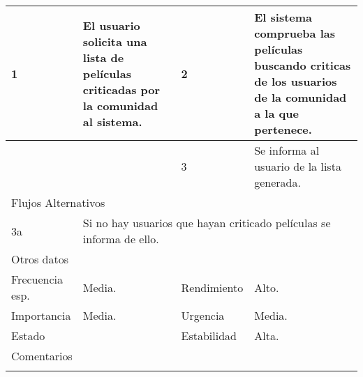 \documentclass{article}
\begin{document}
\begin{table}[h]
\begin{tabular}{|l|l|l|l|l|l|}
\hline
\multicolumn{1}{|p{1cm}|}{1} & \multicolumn{2}{p{3cm}}{El usuario solicita una lista de películas criticadas por la comunidad al sistema.} & \multicolumn{1}{|p{1cm}|}{2} & \multicolumn{2}{p{3cm}|}{El sistema comprueba las películas buscando criticas de los usuarios de la comunidad a la que pertenece.}\\
\hline
\multicolumn{1}{|p{1cm}|}{} & \multicolumn{2}{p{3cm}}{} & \multicolumn{1}{|p{1cm}|}{3} & \multicolumn{2}{p{3cm}|}{Se informa al usuario de la lista generada.}\\
\hline
\multicolumn{6}{|p{10cm}|}{Flujos Alternativos}\\
\hline
\multicolumn{1}{|p{1cm}}{3a} & \multicolumn{5}{|p{9cm}|}{Si no hay usuarios que hayan criticado películas se informa de ello.}\\
\hline
\multicolumn{6}{|p{10cm}|}{Otros datos}\\
\hline
\multicolumn{1}{|p{2cm}|}{Frecuencia esp.} & \multicolumn{2}{p{3cm}}{Media.} & \multicolumn{1}{|p{2cm}|}{Rendimiento} & \multicolumn{2}{p{3cm}|}{Alto.}\\
\hline
\multicolumn{1}{|p{2cm}|}{Importancia} & \multicolumn{2}{p{3cm}}{Media.} & \multicolumn{1}{|p{2cm}|}{Urgencia} & \multicolumn{2}{p{3cm}|}{Media.}\\
\hline
\multicolumn{1}{|p{2cm}|}{Estado} & \multicolumn{2}{p{3cm}}{} & \multicolumn{1}{|p{2cm}|}{Estabilidad} & \multicolumn{2}{p{3cm}|}{Alta.}\\
\hline
\multicolumn{6}{|p{10cm}|}{Comentarios}\\
\hline
\multicolumn{6}{|p{10cm}|}{}\\
\hline
\end{tabular}
\end{table}
\end{document}
